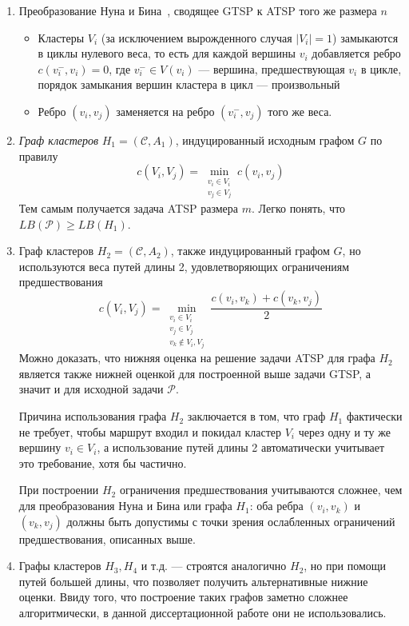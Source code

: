 \begin{enumerate}
  \item Преобразование Нуна и Бина~\cite{NoonBean1993},
    сводящее GTSP к ATSP того же размера $n$
  \begin{itemize}
    \item
    Кластеры $V_i$
    (за исключением вырожденного случая $|V_i|=1$)
    замыкаются в циклы нулевого веса,
    то есть для каждой вершины $v_i$ добавляется ребро
    $c(v_i^-,v_i)=0$,
    где $v_i^- \in V(v_i)$ --- вершина, предшествующая $v_i$ в цикле,
    порядок замыкания вершин кластера в цикл --- произвольный
    \item
    Ребро $(v_i, v_j)$
    заменяется на ребро $(v_i^-,v_j)$
    того же веса.
  \end{itemize}
  \item
  \textit{Граф кластеров}
  $H_1 = (\mathcal C, A_1)$,
  индуцированный исходным графом $G$
  по правилу
  $$
    c(V_i, V_j)=\min_{\substack{v_i\in V_i \\ v_j \in V_j}}
    c(v_i,v_j)
  $$
  Тем самым получается задача ATSP размера $m$.
  Легко понять, что
  $LB(\mathcal P) \geqslant LB(H_1)$.
  \item
  Граф кластеров
  $H_2 = (\mathcal C, A_2)$,
  также индуцированный графом $G$,
  но используются веса путей длины 2,
  удовлетворяющих ограничениям предшествования
  $$
    c(V_i, V_j)=\min_{\substack{v_i\in V_i \\ v_j \in V_j \\ v_k\notin V_i, V_j}}
    \frac{c(v_i,v_k)+c(v_k,v_j)}{2}
  $$
  Можно доказать,
  что нижняя оценка на решение задачи ATSP
  для графа $H_2$
  является также нижней оценкой для
  построенной выше задачи GTSP,
  а значит и для исходной задачи
  $\mathcal P$.

  Причина использования графа $H_2$
  заключается в том, что
  граф $H_1$
  фактически не требует,
  чтобы маршрут входил и покидал кластер $V_i$
  через одну и ту же вершину $v_i \in V_i$,
  а использование путей длины 2
  автоматически учитывает это требование,
  хотя бы частично.

  При построении $H_2$
  ограничения предшествования учитываются сложнее,
  чем для преобразования Нуна и Бина или графа $H_1$:
  оба ребра
  $(v_i, v_k)$ и $(v_k, v_j)$
  должны быть допустимы с точки зрения ослабленных
  ограничений предшествования,
  описанных выше.
  \item
  Графы кластеров $H_3, H_4$ и т.д. ---
  строятся аналогично $H_2$,
  но при помощи путей большей длины,
  что позволяет получить альтернативные нижние оценки.
  Ввиду того,
  что построение таких графов заметно сложнее алгоритмически,
  в данной диссертационной работе они не использовались.
\end{enumerate}

